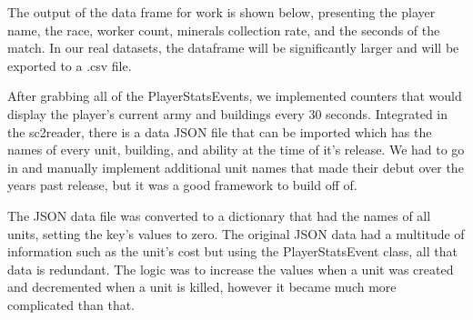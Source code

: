 \documentclass[a4paper,12pt]{report}
\begin{document}
The output of the data frame for work is shown below, presenting the player name, the race, worker count, minerals collection rate, and the seconds of the match. In our real datasets, the dataframe will be significantly larger and will be exported to a .csv file. 

After grabbing all of the PlayerStatsEvents, we implemented counters that would display the player’s current army and buildings every 30 seconds. Integrated in the sc2reader, there is a data JSON file that can be imported which has the names of every unit, building, and ability at the time of it’s release. We had to go in and manually implement additional unit names that made their debut over the years past release, but it was a good framework to build off of. 


The JSON data file was converted to a dictionary that had the names of all units, setting the key’s values to zero. The original JSON data had a multitude of information such as the unit’s cost but using the PlayerStatsEvent class, all that data is redundant. The logic was to increase the values when a unit was created and decremented when a unit is killed, however it became much more complicated than that. 
\end{document}
